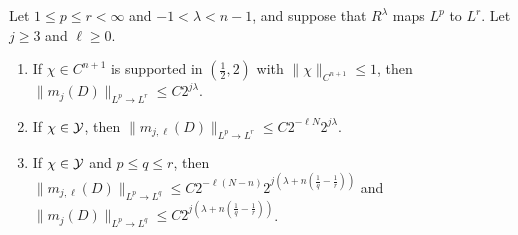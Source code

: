 \begin{lemma}\label{lem:single}
Let $1\le p\le r<\infty$ and $-1<\lambda<n-1$, and suppose that $R^\lambda$ maps $L^p$ to $L^r$. Let
$j\ge3$ and $\ell\ge0$.
\begin{enumerate}[label=\textup{(\roman*)}]
\item If $\chi\in C^{n+1}$ is supported in $(\frac12,2)$ with $\|\chi\|_{C^{n+1}}\le1$, then
$\|m_j(D)\|_{L^p\to L^r}\le C2^{j\lambda}$.
\item If $\chi\in\mathcal Y$, then $\|m_{j,\ell}(D)\|_{L^p\to L^r}\le C2^{-\ell N}2^{j\lambda}$.
\item If $\chi\in\mathcal Y$ and $p\le q\le r$, then
$\|m_{j,\ell}(D)\|_{L^p\to L^q}\le C2^{-\ell(N-n)}2^{j(\lambda+n(\frac1q-\frac1r))}$ and
$\|m_j(D)\|_{L^p\to L^q}\le C2^{j(\lambda+n(\frac1q-\frac1r))}$.
\end{enumerate}
\end{lemma}

